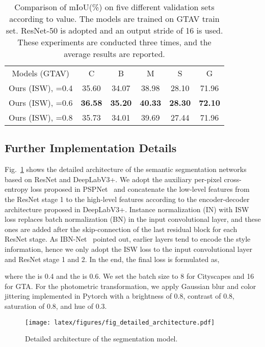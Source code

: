 \documentclass[final]{latex/cvpr}
\newcommand{\drule}{\specialrule{0.2pt}{1pt}{1pt}\specialrule{0.2pt}{0pt}{\belowrulesep}}
\begin{document}
\begin{table}[h!]
\vspace{-0.0cm}
\begin{center}
\footnotesize
\begin{tabular}{c|c|c|c|c||c}
\toprule
Models (GTAV) & C & B & M & S & G \\
\drule
Ours (ISW), =0.4 & 35.60 & 34.07 & 38.98 &  28.10 & 71.96      \\ 
\midrule
Ours (ISW), =0.6 & \textbf{36.58} & \textbf{35.20}  & \textbf{40.33}   & \textbf{28.30}   &   \textbf{72.10}   \\ 
\midrule
Ours (ISW), =0.8 & 35.73 & 34.01 & 39.69  &  27.44   &  71.96 \\ 
\bottomrule
\end{tabular}
\end{center}
\vspace*{-0.2cm}
\caption{Comparison of mIoU(\%) on five different validation sets according to  value. The models are trained on GTAV train set. ResNet-50 is adopted and an output stride of 16 is used. These experiments are conducted three times, and the average results are reported.}
\label{tab_hyper_parameters3}
\vspace{-0.1cm}
\end{table}

\vspace*{-0.2cm}
\subsection{Further Implementation Details}
\vspace*{-0.0cm}
Fig.~\ref{fig:supp_detailed} shows the detailed architecture of the semantic segmentation networks based on ResNet and DeepLabV3+. We adopt the auxiliary per-pixel cross-entropy loss proposed in PSPNet~\cite{zhao2017pyramid} and concatenate the low-level features from the ResNet stage 1 to the high-level features according to the encoder-decoder architecture proposed in DeepLabV3+. Instance normalization (IN) with ISW loss replaces batch normalization (BN) 
in the input convolutional layer, and these ones are added after the skip-connection of the last residual block for each ResNet stage.
As IBN-Net~\cite{pan2018two} pointed out, earlier layers tend to encode the style information, hence we only adopt the ISW loss to the input convolutional layer and ResNet stage 1 and 2. In the end, the final loss  is formulated as,

where the  is 0.4 and the  is 0.6. We set the batch size to 8 for Cityscapes and 16 for GTA. For the photometric transformation, we apply Gaussian blur and color jittering implemented in Pytorch with a brightness of 0.8, contrast of 0.8, saturation of 0.8, and hue of 0.3.
\begin{figure}[h!]
\vspace*{-0.1cm}
\centering
  \texttt{[image: latex/figures/fig\_detailed\_architecture.pdf]}
  \vspace*{-0.2cm}
  \caption{Detailed architecture of the segmentation model.}
\label{fig:supp_detailed}
\vspace*{-0.3cm}
\end{figure}
\end{document}
